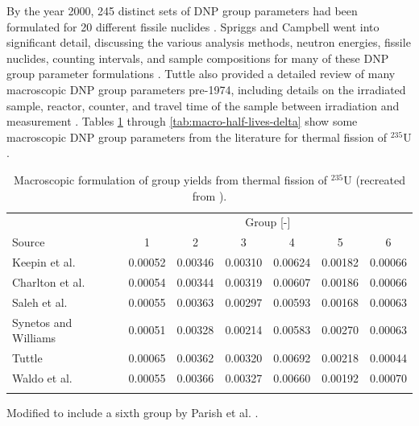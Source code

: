 By the year 2000, 245 distinct sets of \gls{DNP} group parameters had been formulated for 20 different fissile nuclides \cite{Spriggs2000Summary}.
Spriggs and Campbell went into significant detail, discussing the various analysis methods, neutron energies, fissile nuclides, counting intervals, and sample compositions for many of these \gls{DNP} group parameter formulations \cite{Spriggs2000Summary}.
Tuttle also provided a detailed review of many macroscopic \gls{DNP} group parameters pre-1974, including details on the irradiated sample, reactor, counter, and travel time of the sample between irradiation and measurement \cite{tuttle1975delayed}.
Tables \ref{tab:macro-yields} through \ref{tab:macro-half-lives-delta} show some macroscopic \gls{DNP} group parameters from the literature for thermal fission of $^{235}$U \cite{parish1999status}.

\begin{table}[!h]
\centering
\begin{threeparttable}
\caption{Macroscopic formulation of group yields from thermal fission of $^{235}$U (recreated from \cite{parish1999status}).}
\begin{tabular}{lcccccc}
\hline
 & \multicolumn{6}{c}{Group [-]} \\
Source & 1 & 2 & 3 & 4 & 5 & 6 \\
\hline
Keepin et al. \cite{keepin1957delayed}   & 0.00052 & 0.00346 & 0.00310 & 0.00624 & 0.00182 & 0.00066 \\
Charlton et al. \cite{charlton1996delayed}\tnote{*} & 0.00054 & 0.00344 & 0.00319 & 0.00607 & 0.00186 & 0.00066 \\
Saleh et al. \cite{saleh1997measurements} & 0.00055 & 0.00363 & 0.00297 & 0.00593 & 0.00168 & 0.00063 \\
Synetos and Williams \cite{synetos1983delayed}\tnote{*} & 0.00051 & 0.00328 & 0.00214 & 0.00583 & 0.00270 & 0.00063 \\
Tuttle \cite{tuttle1975delayed}    & 0.00065 & 0.00362 & 0.00320 & 0.00692 & 0.00218 & 0.00044 \\
Waldo et al.\cite{waldo1981delayed}    & 0.00055 & 0.00366 & 0.00327 & 0.00660 & 0.00192 & 0.00070 \\
\hline
\label{tab:macro-yields}
\end{tabular}
\begin{tablenotes}
\item[*] Modified to include a sixth group by Parish et al. \cite{parish1999status}.
\end{tablenotes}
\end{threeparttable}
\end{table}

